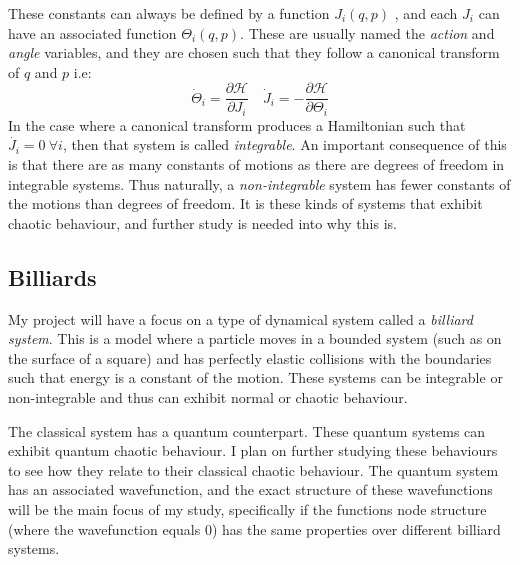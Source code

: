 \documentclass[12pt,a4paper]{amsart}
\begin{document}
These constants can always be defined by a function $J_{i}(q, p)$ \cite{HILBORN}, and each $J_{i}$ can have an associated function $\Theta_{i}(q, p)$. These are usually named the \textit{action} and \textit{angle} variables, and they are chosen such that they follow a canonical transform of $q$ and $p$ i.e:
$$\dot{\Theta}_{i} = \frac{\partial \mathcal{H}}{\partial J_{i}} \quad \dot{J}_{i} = -\frac{\partial \mathcal{H}}{\partial \Theta_{i}}$$
In the case where a canonical transform produces a Hamiltonian such that $\dot{J_{i}} = 0 \ \forall i$, then that system is called \textit{integrable}. An important consequence of this is that there are as many constants of motions as there are degrees of freedom in integrable systems. Thus naturally, a \textit{non-integrable} system has fewer constants of the motions than degrees of freedom. It is these kinds of systems that exhibit chaotic behaviour, and further study is needed into why this is.

 

\subsection{Billiards}

My project will have a focus on a type of dynamical system called a \textit{billiard system}. This is a model where a particle moves in a bounded system (such as on the surface of a square) and has perfectly elastic collisions with the boundaries such that energy is a constant of the motion. These systems can be integrable or non-integrable and thus can exhibit normal or chaotic behaviour. 

The classical system has a quantum counterpart. These quantum systems can exhibit quantum chaotic behaviour. I plan on further studying these behaviours to see how they relate to their classical chaotic behaviour. The quantum system has an associated wavefunction, and the exact structure of these wavefunctions will be the main focus of my study, specifically if the functions node structure (where the wavefunction equals 0) has the same properties over different billiard systems.

\end{document}
